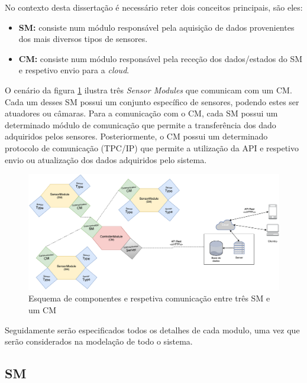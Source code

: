 No contexto desta dissertação é necessário reter dois conceitos principais, são eles: 

\begin{itemize}
	\item \textbf{\acl{SM}:} consiste num módulo responsável pela aquisição de dados provenientes dos mais diversos tipos de sensores. 
	
	
	\item \textbf{\acl{CM}:} consiste num módulo responsável pela receção dos dados/estados do \acl{SM} e respetivo envio para a \textit{cloud}.  
	
\end{itemize}


O cenário da figura \ref{esquema1} ilustra três \textit{Sensor Modules} que comunicam com um \acl{CM}. Cada um desses \acl{SM} possui um conjunto específico de sensores, podendo estes ser atuadores ou câmaras. Para a comunicação com o \acl{CM}, cada \acl{SM} possui um determinado módulo de comunicação que permite a transferência dos dado adquiridos pelos sensores. Posteriormente, o \acl{CM} possui um determinado protocolo de comunicação (TPC/IP) que permite a utilização da \ac{API} e respetivo envio ou atualização dos dados adquiridos pelo sistema. 



\begin{figure}[h]
	\centering
	\includegraphics[scale=0.3]{esquemas/general-electronic-modules.pdf}
	\caption{Esquema de componentes e respetiva comunicação entre três \ac{SM} e um \ac{CM}}
	\label{esquema1}
\end{figure}


Seguidamente serão especificados todos os detalhes de cada modulo, uma vez que serão considerados na modelação de todo o sistema. 



\subsection{\acl{SM}}



